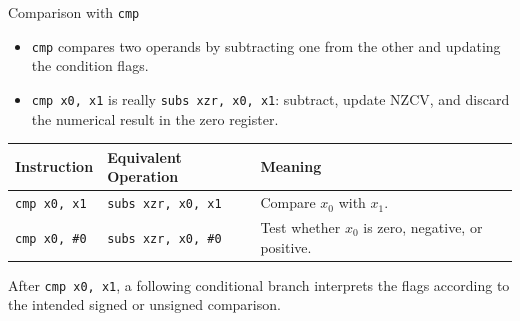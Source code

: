 \documentclass[aspectratio=169,11pt,t]{beamer}
\newcommand{\code}[1]{\texttt{#1}}
\begin{document}
\begin{frame}{Comparison with \texttt{cmp}}
\begin{itemize}\setlength{\itemsep}{5pt}
  \item \code{cmp} compares two operands by subtracting one from the other and updating the condition flags.
  \item \code{cmp x0, x1} is really \code{subs xzr, x0, x1}: subtract, update NZCV, and discard the numerical result in the zero register.
\end{itemize}

\vspace{0.20cm}
\begin{center}
\small
\setlength{\tabcolsep}{6pt}
\begin{tabular}{p{}p{}p{}}
\toprule
\textbf{Instruction} & \textbf{Equivalent Operation} & \textbf{Meaning} \\
\midrule
\code{cmp x0, x1} & \code{subs xzr, x0, x1} & Compare $x_0$ with $x_1$. \\
\code{cmp x0, \#0} & \code{subs xzr, x0, \#0} & Test whether $x_0$ is zero, negative, or positive. \\
\bottomrule
\end{tabular}
\end{center}

\vspace{0.18cm}
After \code{cmp x0, x1}, a following conditional branch interprets the flags according to the intended signed or unsigned comparison.
\end{frame}






\end{document}

